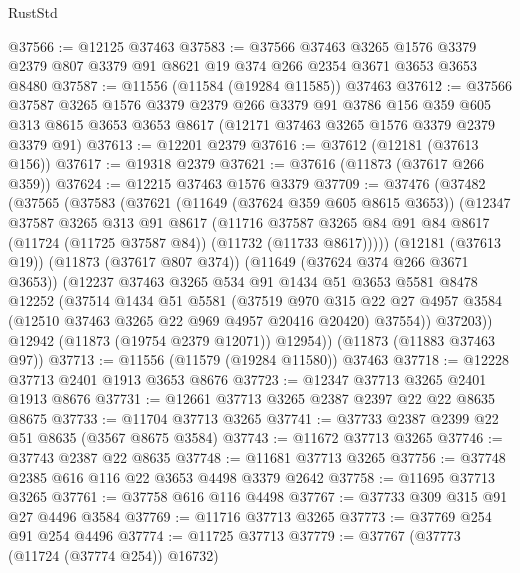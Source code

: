 \begin{lexlean}{RustStd}
\begin{coremodule}
@37566 := @12125 @37463
@37583 := @37566
    @37463
    @3265
    @1576
    @3379
    @2379
    @807
    @3379
    @91
    @8621
    @19
    @374
    @266
    @2354
    @3671
    @3653
    @3653
    @8480
@37587 := @11556 (@11584 (@19284 @11585)) @37463
@37612 := @37566
    @37587
    @3265
    @1576
    @3379
    @2379
    @266
    @3379
    @91
    @3786
    @156
    @359
    @605
    @313
    @8615
    @3653
    @3653
    @8617
    (@12171 @37463 @3265 @1576 @3379 @2379 @3379 @91)
@37613 := @12201 @2379
@37616 := @37612 (@12181 (@37613 @156))
@37617 := @19318 @2379
@37621 := @37616 (@11873 (@37617 @266 @359))
@37624 := @12215 @37463 @1576 @3379
@37709 := @37476
    (@37482
      (@37565
        (@37583
          (@37621
            (@11649 (@37624 @359 @605 @8615 @3653))
            (@12347
              @37587
              @3265
              @313
              @91
              @8617
              (@11716
                @37587
                @3265
                @84
                @91
                @84
                @8617
                (@11724 (@11725 @37587 @84))
                (@11732 (@11733 @8617)))))
          (@12181 (@37613 @19))
          (@11873 (@37617 @807 @374))
          (@11649 (@37624 @374 @266 @3671 @3653))
          (@12237
            @37463
            @3265
            @534
            @91
            @1434
            @51
            @3653
            @5581
            @8478
            @12252
            (@37514
              @1434
              @51
              @5581
              (@37519
                @970
                @315
                @22
                @27
                @4957
                @3584
                (@12510 @37463 @3265 @22 @969 @4957 @20416 @20420)
                @37554))
            @37203))
        @12942
        (@11873 (@19754 @2379 @12071))
        @12954))
    (@11873 (@11883 @37463 @97))
@37713 := @11556 (@11579 (@19284 @11580)) @37463
@37718 := @12228 @37713 @2401 @1913 @3653 @8676
@37723 := @12347 @37713 @3265 @2401 @1913 @8676
@37731 := @12661 @37713 @3265 @2387 @2397 @22 @22 @8635 @8675
@37733 := @11704 @37713 @3265
@37741 := @37733 @2387 @2399 @22 @51 @8635 (@3567 @8675 @3584)
@37743 := @11672 @37713 @3265
@37746 := @37743 @2387 @22 @8635
@37748 := @11681 @37713 @3265
@37756 := @37748 @2385 @616 @116 @22 @3653 @4498 @3379 @2642
@37758 := @11695 @37713 @3265
@37761 := @37758 @616 @116 @4498
@37767 := @37733 @309 @315 @91 @27 @4496 @3584
@37769 := @11716 @37713 @3265
@37773 := @37769 @254 @91 @254 @4496
@37774 := @11725 @37713
@37779 := @37767 (@37773 (@11724 (@37774 @254)) @16732)

\end{coremodule}
\end{lexlean}
